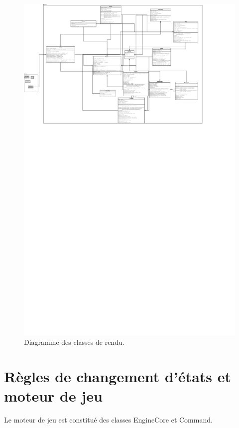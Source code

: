 \documentclass[a4paper,12pt]{article}
\begin{document}
\begin{landscape}
\begin{figure}[p]
\includegraphics[width=\paperheight]{render.pdf}
\caption{\label{uml:render}Diagramme des classes de rendu.} 
\end{figure}
\end{landscape}

\clearpage
\section{Règles de changement d'états et moteur de jeu}

Le moteur de jeu est constitué des classes EngineCore et Command.\\
\end{document}
